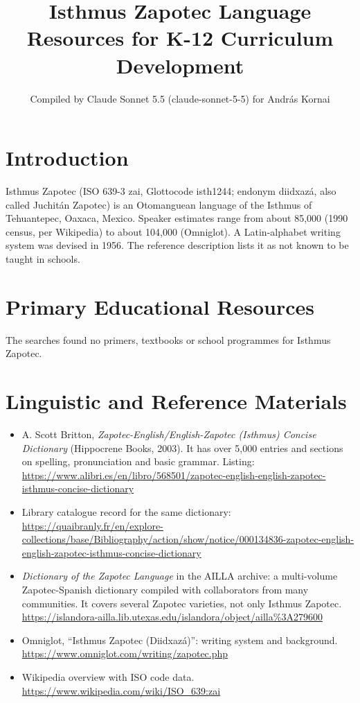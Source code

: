 \documentclass[12pt]{article}
\title{Isthmus Zapotec Language Resources for K-12 Curriculum Development}
\author{Compiled by Claude Sonnet 5.5 (claude-sonnet-5-5) for Andr\'as Kornai}
\date{}
\begin{document}
\maketitle

\section{Introduction}
Isthmus Zapotec (ISO 639-3 zai, Glottocode isth1244; endonym diidxaz\'a, also called Juchit\'an Zapotec) is an Otomanguean language of the Isthmus of Tehuantepec, Oaxaca, Mexico. Speaker estimates range from about 85,000 (1990 census, per Wikipedia) to about 104,000 (Omniglot). A Latin-alphabet writing system was devised in 1956. The reference description lists it as not known to be taught in schools.

\section{Primary Educational Resources}
The searches found no primers, textbooks or school programmes for Isthmus Zapotec.

\section{Linguistic and Reference Materials}
\begin{itemize}
\item A. Scott Britton, \emph{Zapotec-English/English-Zapotec (Isthmus) Concise Dictionary} (Hippocrene Books, 2003). It has over 5,000 entries and sections on spelling, pronunciation and basic grammar. Listing: \url{https://www.alibri.es/en/libro/568501/zapotec-english-english-zapotec-isthmus-concise-dictionary}
\item Library catalogue record for the same dictionary: \url{https://quaibranly.fr/en/explore-collections/base/Bibliography/action/show/notice/000134836-zapotec-english-english-zapotec-isthmus-concise-dictionary}
\item \emph{Dictionary of the Zapotec Language} in the AILLA archive: a multi-volume Zapotec-Spanish dictionary compiled with collaborators from many communities. It covers several Zapotec varieties, not only Isthmus Zapotec. \url{https://islandora-ailla.lib.utexas.edu/islandora/object/ailla%3A279600}
\item Omniglot, ``Isthmus Zapotec (Diidxaz\'a)'': writing system and background. \url{https://www.omniglot.com/writing/zapotec.php}
\item Wikipedia overview with ISO code data. \url{https://www.wikipedia.com/wiki/ISO_639:zai}
\end{itemize}
\end{document}
